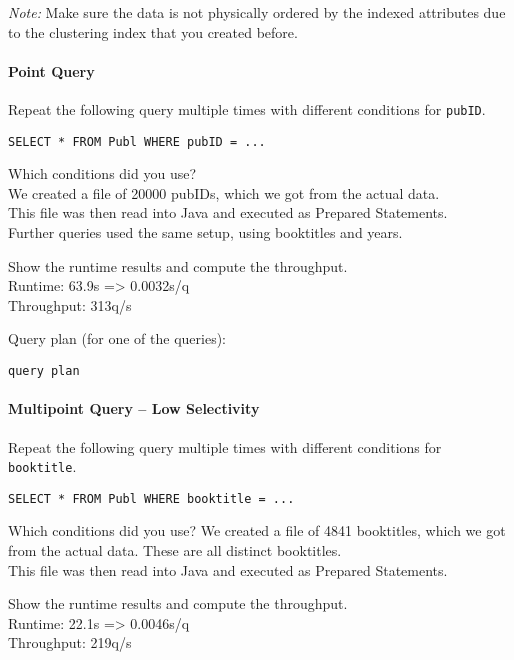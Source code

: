 \documentclass[11pt]{scrartcl}
\begin{document}
\noindent \emph{Note:} Make sure the data is not physically ordered by
the indexed attributes due to the clustering index that you created
before.

\paragraph{Point Query}

Repeat the following query multiple times with different conditions for {\tt pubID}.

{\small
\begin{verbatim}
SELECT * FROM Publ WHERE pubID = ...
\end{verbatim}
}

\noindent
Which conditions did you use?\\
We created a file of 20000 pubIDs, which we got from the actual data.\\
This file was then read into Java and executed as Prepared Statements.\\
Further queries used the same setup, using booktitles and years.

\smallskip\noindent
Show the runtime results and compute the throughput.\\
Runtime: 63.9s => 0.0032s/q\\
Throughput: 313q/s

\smallskip\noindent
Query plan (for one of the queries):
{\small
\begin{verbatim}
query plan
\end{verbatim}
}


\paragraph{Multipoint Query -- Low Selectivity}

Repeat the following query multiple times with different conditions for {\tt booktitle}.

{\small
\begin{verbatim}
SELECT * FROM Publ WHERE booktitle = ...
\end{verbatim}
}

\noindent
Which conditions did you use?
We created a file of 4841 booktitles, which we got from the actual data. These are all distinct booktitles.\\
This file was then read into Java and executed as Prepared Statements.

\smallskip\noindent
Show the runtime results and compute the throughput.\\
Runtime: 22.1s => 0.0046s/q\\
Throughput: 219q/s
\end{document}
